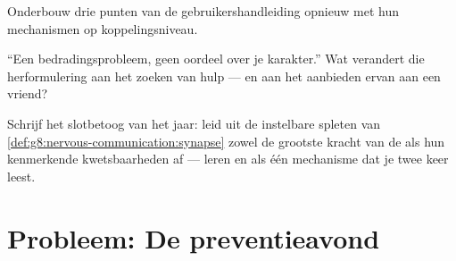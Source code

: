 \begin{exercise}[$\star\star$]\label{exo:g8:protecting-the-nervous-system:10}
Onderbouw drie punten van de gebruikershandleiding opnieuw met hun
mechanismen op koppelingsniveau.
\end{exercise}

\begin{exercise}[$\star\star$]\label{exo:g8:protecting-the-nervous-system:11}
``Een bedradingsprobleem, geen oordeel over je karakter.'' Wat verandert
die herformulering aan het zoeken van hulp --- en aan het aanbieden ervan
aan een vriend?
\end{exercise}

\begin{exercise}[$\star\star\star$]\label{exo:g8:protecting-the-nervous-system:12}
Schrijf het slotbetoog van het jaar: leid uit de instelbare spleten van
\cref{def:g8:nervous-communication:synapse} zowel de grootste kracht van de
 als hun kenmerkende kwetsbaarheden af --- leren en  als
één mechanisme dat je twee keer leest.
\end{exercise}

\section{Probleem: De preventieavond}


